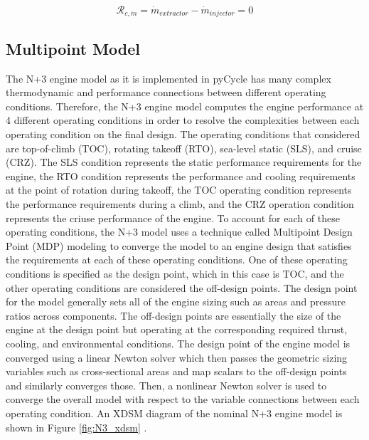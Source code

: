 \documentclass[conf]{new-aiaa}
\begin{document}
\begin{equation}
    \mathcal{R}_{c,\dot{m}} = \dot{m}_{extractor} - \dot{m}_{injector} = 0
\end{equation}

\subsection{Multipoint Model}
The N+3 engine model as it is implemented in pyCycle has many complex thermodynamic and performance connections between different operating conditions.
Therefore, the N+3 engine model computes the engine performance at 4 different operating conditions in order to resolve the complexities between each operating condition on the final design.
The operating conditions that considered are top-of-climb (TOC), rotating takeoff (RTO), sea-level static (SLS), and cruise (CRZ).
The SLS condition represents the static performance requirements for the engine, the RTO condition represents the performance and cooling requirements at the point of rotation during takeoff, the TOC operating condition represents the performance requirements during a climb, and the CRZ operation condition represents the criuse performance of the engine.
To account for each of these operating conditions, the N+3 model uses a technique called Multipoint Design Point (MDP) modeling to converge the model to an engine design that satisfies the requirements at each of these operating conditions.
One of these operating conditions is specified as the design point, which in this case is TOC, and the other operating conditions are considered the off-design points.
The design point for the model generally sets all of the engine sizing such as areas and pressure ratios across components.
The off-design points are essentially the size of the engine at the design point but operating at the corresponding required thrust, cooling, and environmental conditions.
The design point of the engine model is converged using a linear Newton solver which then passes the geometric sizing variables such as cross-sectional areas and map scalars to the off-design points and similarly converges those.
Then, a nonlinear Newton solver is used to converge the overall model with respect to the variable connections between each operating condition.
An XDSM diagram of the nominal N+3 engine model is shown in Figure \ref{fig:N3_xdsm} \cite{Hendricks2019}.
\end{document}

